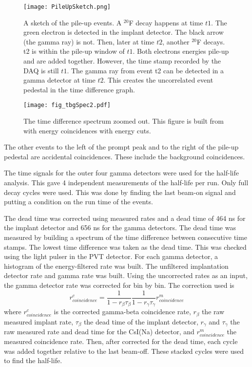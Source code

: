 \documentclass[MaxHughesThesis.tex]{subfiles}
\begin{document}
\begin{figure}
	\centerline{\texttt{[image: PileUpSketch.png]}}
	\caption{A sketch of the pile-up events.
		 A $^{20}$F decay happens at time $t1$.
		 The green electron is detected in the implant detector.
		 The black arrow (the gamma ray) is not.
		 Then, later at time $t2$, another $^{20}$F decays.
		 t2 is within the pile-up window of $t1$.
		 Both electrons energies pile-up and are added together.
		 However, the time stamp recorded by the DAQ is still $t1$.
		 The gamma ray from event t2 can be detected in a gamma detector at time $t2$.
		 This creates the uncorrelated event pedestal in the time difference graph.
		 }
	\label{fig:PileUp}
\end{figure}

\begin{figure}
	\centerline{\texttt{[image: fig\_tbgSpec2.pdf]}}	
	\caption{The time difference spectrum zoomed out.
		 This figure is built from with energy coincidences with energy cuts.}
	\label{fig:timediff2}
\end{figure}

The other events to the left of the prompt peak and to the right of the pile-up pedestal are accidental coincidences.
These include the background coincidences.

The time signals for the outer four gamma detectors were used for the half-life analysis.
This gave 4 independent measurements of the half-life per run. 
Only full decay cycles were used. 
This was done by finding the last beam-on signal and putting a condition on the run time of the events.

The dead time was corrected using measured rates and a dead time of 464 ns for the implant detector and 656 ns for the gamma detectors.  
The dead time was measured by building a spectrum of the time difference between consecutive time stamps.
The lowest time difference was taken as the dead  time. 
This was checked using the light pulser in the PVT detector.
For each gamma detector, a histogram of the energy-filtered rate was built.
The unfiltered implantation detector rate and gamma rate was built.
Using the uncorrected rates as an input, the gamma detector rate was corrected for bin by bin.
The correction used is 
%
\begin{equation}
r^{c}_{coincidence} = \frac{1}{1 - r_{\beta}\tau_{\beta}}\frac{1}{1 - r_{\gamma}\tau_{\gamma}}r^{m}_{coincidence} 
	\label{eq:dtc} 
\end{equation}
%
where $r^{c}_{coincidence}$ is the corrected gamma-beta coincidence rate, $r_{\beta}$ the raw measured implant rate, $\tau_{\beta}$ the dead time of the implant detector, $r_{\gamma}$ and $\tau_{\gamma}$ the raw measured rate and dead time for the CsI(Na) detector, and $r^{m}_{coincidence}$ the measured coincidence rate.   
Then, after corrected for the dead time, each cycle was added together relative to the last beam-off.
These stacked cycles were used to find the half-life.
\end{document}
